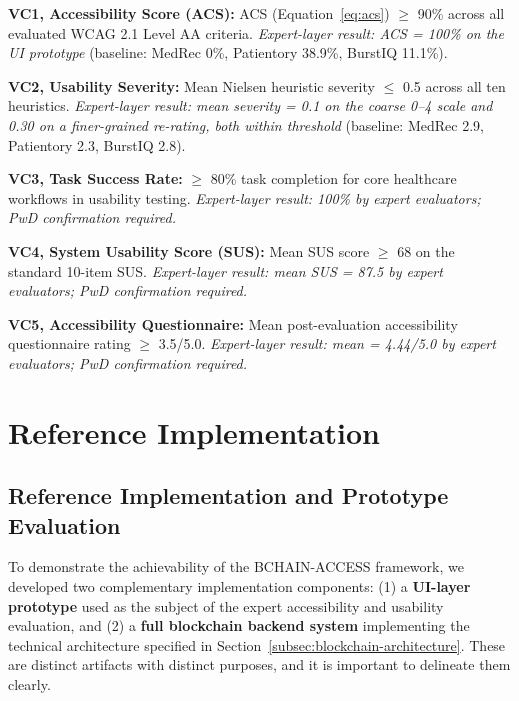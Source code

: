 \documentclass[journal,onecolumn]{IEEEtran}
\begin{document}
\textbf{VC1, Accessibility Score (ACS):} ACS (Equation~\ref{eq:acs}) $\geq$ 90\% across all evaluated WCAG 2.1 Level AA criteria. \textit{Expert-layer result: ACS = 100\% on the UI prototype} (baseline: MedRec 0\%, Patientory 38.9\%, BurstIQ 11.1\%).

\textbf{VC2, Usability Severity:} Mean Nielsen heuristic severity $\leq$ 0.5 across all ten heuristics. \textit{Expert-layer result: mean severity = 0.1 on the coarse 0--4 scale and 0.30 on a finer-grained re-rating, both within threshold} (baseline: MedRec 2.9, Patientory 2.3, BurstIQ 2.8).

\textbf{VC3, Task Success Rate:} $\geq$ 80\% task completion for core healthcare workflows in usability testing. \textit{Expert-layer result: 100\% by expert evaluators; PwD confirmation required.}

\textbf{VC4, System Usability Score (SUS):} Mean SUS score $\geq$ 68 on the standard 10-item SUS. \textit{Expert-layer result: mean SUS = 87.5 by expert evaluators; PwD confirmation required.}

\textbf{VC5, Accessibility Questionnaire:} Mean post-evaluation accessibility questionnaire rating $\geq$ 3.5/5.0. \textit{Expert-layer result: mean = 4.44/5.0 by expert evaluators; PwD confirmation required.}

\section{Reference Implementation}
\label{sec:implementation}

\subsection{Reference Implementation and Prototype Evaluation}

To demonstrate the achievability of the BCHAIN-ACCESS framework, we developed two complementary implementation components: (1) a \textbf{UI-layer prototype} used as the subject of the expert accessibility and usability evaluation, and (2) a \textbf{full blockchain backend system} implementing the technical architecture specified in Section~\ref{subsec:blockchain-architecture}. These are distinct artifacts with distinct purposes, and it is important to delineate them clearly.
\end{document}
